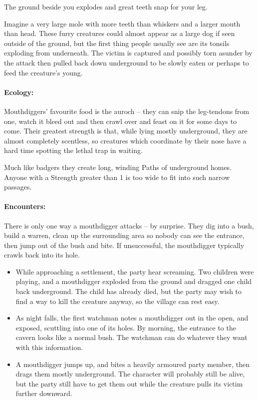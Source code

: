 \begin{multicols}{2}
\begin{boxtext}

  The ground beside you explodes and great teeth snap for your leg.

\end{boxtext}

Imagine a very large mole with more teeth than whiskers and a larger mouth than head.
These furry creatures could almost appear as a large dog if seen outside of the ground, but the first thing people usually see are its tonsils exploding from underneath.
The victim is captured and possibly torn asunder by the attack then pulled back down underground to be slowly eaten or perhaps to feed the creature's young.

\paragraph{Ecology:} Mouthdiggers' favourite food is the auroch -- they can snip the leg-tendons from one, watch it bleed out and then crawl over and feast on it for some days to come.
Their greatest strength is that, while lying mostly underground, they are almost completely scentless, so creatures which coordinate by their nose have a hard time spotting the lethal trap in waiting.

Much like badgers they create long, winding Paths of underground homes.  Anyone with a Strength greater than 1 is too wide to fit into such narrow passages.

\paragraph{Encounters:} There is only one way a mouthdigger attacks -- by surprise.  They dig into a bush, build a warren, clean up the surrounding area so nobody can see the entrance, then jump out of the bush and bite.  If unsuccessful, the mouthdigger typically crawls back into its hole.

\begin{itemize}

  \item
  While approaching a settlement, the party hear screaming.
  Two children were playing, and a mouthdigger exploded from the ground and dragged one child back underground.
  The child has already died, but the party may wish to find a way to kill the creature anyway, so the village can rest easy.
  \item
  As night falls, the first watchman notes a mouthdigger out in the open, and exposed, scuttling into one of its holes.
  By morning, the entrance to the cavern looks like a normal bush.
  The watchman can do whatever they want with this information.
  \item
  A mouthdigger jumps up, and bites a heavily armoured party member, then drags them mostly underground.
  The character will probably still be alive, but the party still have to get them out while the creature pulls its victim further downward.


\end{itemize}
\end{multicols}

